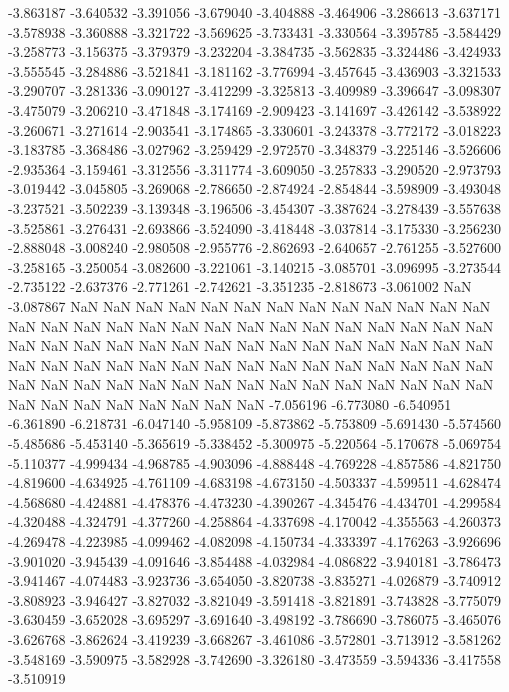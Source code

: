 -3.863187
-3.640532
-3.391056
-3.679040
-3.404888
-3.464906
-3.286613
-3.637171
-3.578938
-3.360888
-3.321722
-3.569625
-3.733431
-3.330564
-3.395785
-3.584429
-3.258773
-3.156375
-3.379379
-3.232204
-3.384735
-3.562835
-3.324486
-3.424933
-3.555545
-3.284886
-3.521841
-3.181162
-3.776994
-3.457645
-3.436903
-3.321533
-3.290707
-3.281336
-3.090127
-3.412299
-3.325813
-3.409989
-3.396647
-3.098307
-3.475079
-3.206210
-3.471848
-3.174169
-2.909423
-3.141697
-3.426142
-3.538922
-3.260671
-3.271614
-2.903541
-3.174865
-3.330601
-3.243378
-3.772172
-3.018223
-3.183785
-3.368486
-3.027962
-3.259429
-2.972570
-3.348379
-3.225146
-3.526606
-2.935364
-3.159461
-3.312556
-3.311774
-3.609050
-3.257833
-3.290520
-2.973793
-3.019442
-3.045805
-3.269068
-2.786650
-2.874924
-2.854844
-3.598909
-3.493048
-3.237521
-3.502239
-3.139348
-3.196506
-3.454307
-3.387624
-3.278439
-3.557638
-3.525861
-3.276431
-2.693866
-3.524090
-3.418448
-3.037814
-3.175330
-3.256230
-2.888048
-3.008240
-2.980508
-2.955776
-2.862693
-2.640657
-2.761255
-3.527600
-3.258165
-3.250054
-3.082600
-3.221061
-3.140215
-3.085701
-3.096995
-3.273544
-2.735122
-2.637376
-2.771261
-2.742621
-3.351235
-2.818673
-3.061002
NaN
-3.087867
NaN
NaN
NaN
NaN
NaN
NaN
NaN
NaN
NaN
NaN
NaN
NaN
NaN
NaN
NaN
NaN
NaN
NaN
NaN
NaN
NaN
NaN
NaN
NaN
NaN
NaN
NaN
NaN
NaN
NaN
NaN
NaN
NaN
NaN
NaN
NaN
NaN
NaN
NaN
NaN
NaN
NaN
NaN
NaN
NaN
NaN
NaN
NaN
NaN
NaN
NaN
NaN
NaN
NaN
NaN
NaN
NaN
NaN
NaN
NaN
NaN
NaN
NaN
NaN
NaN
NaN
NaN
NaN
NaN
NaN
NaN
NaN
NaN
NaN
NaN
NaN
NaN
NaN
NaN
NaN
NaN
-7.056196
-6.773080
-6.540951
-6.361890
-6.218731
-6.047140
-5.958109
-5.873862
-5.753809
-5.691430
-5.574560
-5.485686
-5.453140
-5.365619
-5.338452
-5.300975
-5.220564
-5.170678
-5.069754
-5.110377
-4.999434
-4.968785
-4.903096
-4.888448
-4.769228
-4.857586
-4.821750
-4.819600
-4.634925
-4.761109
-4.683198
-4.673150
-4.503337
-4.599511
-4.628474
-4.568680
-4.424881
-4.478376
-4.473230
-4.390267
-4.345476
-4.434701
-4.299584
-4.320488
-4.324791
-4.377260
-4.258864
-4.337698
-4.170042
-4.355563
-4.260373
-4.269478
-4.223985
-4.099462
-4.082098
-4.150734
-4.333397
-4.176263
-3.926696
-3.901020
-3.945439
-4.091646
-3.854488
-4.032984
-4.086822
-3.940181
-3.786473
-3.941467
-4.074483
-3.923736
-3.654050
-3.820738
-3.835271
-4.026879
-3.740912
-3.808923
-3.946427
-3.827032
-3.821049
-3.591418
-3.821891
-3.743828
-3.775079
-3.630459
-3.652028
-3.695297
-3.691640
-3.498192
-3.786690
-3.786075
-3.465076
-3.626768
-3.862624
-3.419239
-3.668267
-3.461086
-3.572801
-3.713912
-3.581262
-3.548169
-3.590975
-3.582928
-3.742690
-3.326180
-3.473559
-3.594336
-3.417558
-3.510919
